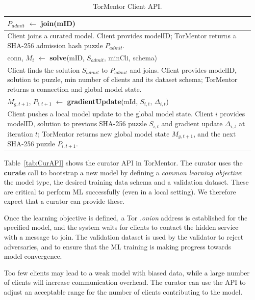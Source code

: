 \begin{table}[t]
\begin{tabular}{p{\textwidth}}
 \hline \hline
 $P_{admit}$ $\leftarrow$ \textbf{join}(mID) \\
 \hline
 Client joins a curated model. Client provides modelID; TorMentor returns
 a SHA-256 admission hash puzzle $P_{admit}$.                          
 \\
 \hline \hline
 conn, $M_t$ $\leftarrow$ \textbf{solve}(mID, $S_{admit}$, minCli, schema) \\
 \hline
 Client finds the solution $S_{admit}$ to $P_{admit}$ and joins. Client
 provides modelID, solution to puzzle, min number of clients and its
 dataset schema; TorMentor returns a connection and global model state.
 \\
 \hline \hline
 $M_{g,t+1}$, $P_{i,t+1}$ $\leftarrow$ \textbf{gradientUpdate}(mId, $S_
 {i,t}$, $\Delta_{i,t}$) \\
 \hline
 Client pushes a local model update to the global model state. Client $i$
 provides modelID, solution to previous SHA-256 puzzle $S_{i,t}$ and
 gradient update $\Delta_{i,t}$ at iteration $t$; TorMentor returns new
 global model state $M_{g,t+1}$, and the next SHA-256 puzzle $P_
 {i,t+1}$. \\
 \hline
\end{tabular} 
\caption{TorMentor Client API.\label{tab:CliAPI} }
\end{table}

Table~\ref{tab:CurAPI} shows the curator API in TorMentor. The curator
uses the \textbf{curate} call to bootstrap a new model by defining
a \emph{common learning objective}: the model type, the desired
training data schema and a validation dataset. These are critical to
perform ML successfully (even in a local setting). We therefore expect
that a curator can provide these.

Once the learning objective is defined, a Tor \textit{.onion} address
is established for the specified model, and the system waits for
clients to contact the hidden service with a message to join. The
validation dataset is used by the validator to reject adversaries, and
to ensure that the ML training is making progress towards model
convergence.

Too few clients may lead to a weak model with biased data, while a
large number of clients will increase communication overhead. The
curator can use the API to adjust an acceptable range for the number of
clients contributing to the model.

